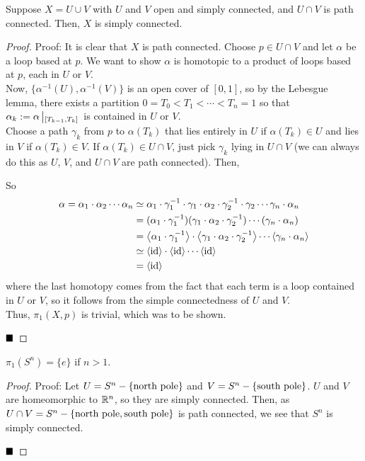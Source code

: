 \begin{lemma}
    Suppose $X = U \cup V$ with $U$ and $V$ open and simply connected, and $U \cap V$ is path connected. Then, $X$ is simply connected.
\end{lemma}
\begin{proof}{Proof:}
    It is clear that $X$ is path connected. Choose $p \in U \cap V$ and let $\alpha$ be a loop based at $p$. We want to show $\alpha$ is homotopic to a product of loops based at $p$, each in $U$ or $V$.\\

    Now, $\{\alpha^{-1}(U), \alpha^{-1}(V)\}$ is an open cover of $[0, 1]$, so by the Lebesgue lemma, there exists a partition $0 = T_0 < T_1 < \cdots < T_n = 1$ so that $\alpha_k := \alpha\res{[T_{k - 1}, T_{k}]}$ is contained in $U$ or $V$.\\

    Choose a path $\gamma_k$ from $p$ to $\alpha(T_k)$ that lies entirely in $U$ if $\alpha(T_k) \in U$ and lies in $V$ if $\alpha(T_k) \in V$. If $\alpha(T_k) \in U \cap V$, just pick $\gamma_k$ lying in $U \cap V$ (we can always do this as $U$, $V$, and $U \cap V$ are path connected). Then,

    So
    \begin{align*}
        \alpha = \alpha_1 \cdot \alpha_2 \cdots \alpha_{n} &\simeq \alpha_1 \cdot \gamma_1^{-1} \cdot \gamma_1 \cdot \alpha_2 \cdot \gamma_2^{-1} \cdot \gamma_2 \cdots \gamma_{n} \cdot \alpha_{n}\\
        &= (\alpha_1 \cdot \gamma_1^{-1})(\gamma_1 \cdot \alpha_2 \cdot \gamma_2^{-1}) \cdots (\gamma_{n} \cdot \alpha_{n})\\
        &= \brac{\alpha_1 \cdot \gamma_1^{-1}} \cdot \brac{\gamma_1 \cdot \alpha_2 \cdot \gamma_2^{-1}} \cdots \brac{\gamma_{n} \cdot \alpha_{n}}\\
        &\simeq \brac{\id} \cdot \brac{\id} \cdots \brac{\id}\\
        &= \brac{\id}
    \end{align*}
    where the last homotopy comes from the fact that each term is a loop contained in $U$ or $V$, so it follows from the simple connectedness of $U$ and $V$.\\

    Thus, $\pi_1(X, p)$ is trivial, which was to be shown.

    $\qed$
\end{proof}

\begin{lemma}
    $\pi_1(S^n) = \{e\}$ if $n > 1$.
\end{lemma}
\begin{proof}{Proof:}
    Let $U = S^n - \{\tt{north pole}\}$ and $V = S^n - \{\tt{south pole}\}$. $U$ and $V$ are homeomorphic to $\R^n$, so they are simply connected. Then, as $U \cap V = S^n - \{\tt{north pole}, \tt{south pole}\}$ is path connected, we see that $S^n$ is simply connected.

    $\qed$
\end{proof}

